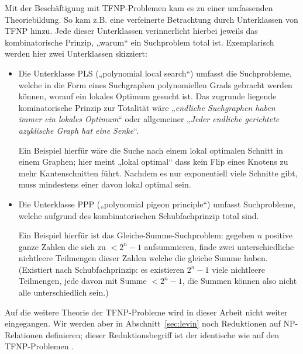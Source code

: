 Mit der Beschäftigung mit TFNP-Problemen kam es zu einer umfassenden Theoriebildung. So kam z.B. eine verfeinerte Betrachtung durch Unterklassen von TFNP hinzu. Jede dieser Unterklassen verinnerlicht hierbei jeweils das kombinatorische Prinzip, „warum“ ein Suchproblem total ist. Exemplarisch werden hier zwei Unterklassen skizziert:
\begin{itemize}
    \item Die Unterklasse PLS („polynomial local search“) umfasst die Suchprobleme, welche in die Form eines Suchgraphen polynomiellen Grads gebracht werden können, worauf ein lokales Optimum gesucht ist.
    Das zugrunde liegende kominatorische Prinzip zur Totalität wäre „\emph{endliche Suchgraphen haben immer ein lokales Optimum}“ oder allgemeiner „\emph{Jeder endliche gerichtete azyklische Graph hat eine Senke}“.

    Ein Beispiel hierfür wäre die Suche nach einem lokal optimalen Schnitt in einem Graphen; hier meint „lokal optimal“ dass kein Flip eines Knotens zu mehr Kantenschnitten führt. Nachdem es nur exponentiell viele Schnitte gibt, muss mindestens einer davon lokal optimal sein.

    \item Die Unterklasse PPP („polynomial pigeon principle“) umfasst Suchprobleme, welche aufgrund des kombinatorischen Schubfachprinzip total sind. 

        Ein Beispiel hierfür ist das Gleiche-Summe-Suchproblem: gegeben $n$ positive ganze Zahlen die sich zu $<2^n-1$ aufsummieren, finde zwei unterschiedliche nichtleere Teilmengen dieser Zahlen welche die gleiche Summe haben. (Existiert nach Schubfachprinzip: es existieren $2^n-1$ viele nichtleere Teilmengen, jede davon mit Summe $<2^n-1$, die Summen können also nicht alle unterschiedlich sein.)
\end{itemize}
Auf die weitere Theorie der TFNP-Probleme wird in dieser Arbeit nicht weiter eingegangen. Wir werden aber in Abschnitt~\ref{sec:levin} noch Reduktionen auf NP-Relationen definieren; dieser Reduktionsbegriff ist der identische wie auf den TFNP-Problemen \textcite{megiddo_total_1991}.




